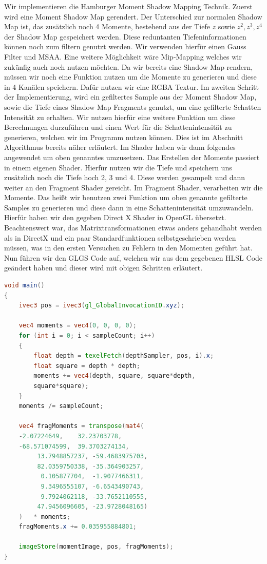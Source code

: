 \documentclass[runningheaders,a4paper]{llncs}
\begin{document}
Wir implementieren die Hamburger Moment Shadow Mapping Technik. 
Zuerst wird eine Moment Shadow Map gerendert. Der Unterschied zur normalen Shadow Map ist, das zusätzlich noch 4 Momente, bestehend aus der Tiefe $z$ sowie $z^2,z^3,z^4$ der Shadow Map gespeichert werden. Diese reduntanten Tiefeninformationen können noch zum filtern genutzt werden. Wir verwenden hierfür einen Gauss Filter und MSAA. Eine weitere Möglichkeit wäre Mip-Mapping welches wir zukünfig auch noch nutzen möchten. Da wir bereits eine Shadow Map rendern, müssen wir  noch eine Funktion nutzen um die Momente zu generieren und diese in 4 Kanälen speichern. Dafür nutzen wir eine RGBA Textur.
Im zweiten Schritt der Implementierung, wird ein gefiltertes Sample aus der Moment Shadow Map, sowie die Tiefe eines Shadow Map Fragments genutzt, um eine gefilterte Schatten Intensität zu erhalten.
Wir nutzen hierfür eine weitere Funktion um diese Berechnungen durzuführen und einen Wert für die Schattenintensität zu generieren, welchen wir im Programm nutzen können. Dies ist im Abschnitt Algorithmus bereits näher erläutert.
Im Shader haben wir dann folgendes angewendet um oben genanntes umzusetzen.
Das Erstellen der Momente passiert in einem eigenen Shader. Hierfür nutzen wir die Tiefe und speichern uns zusätzlich noch die Tiefe hoch 2, 3 und 4. Diese werden gesampelt und dann weiter an den Fragment Shader gereicht.
Im Fragment Shader, verarbeiten wir die Momente. Das heißt wir benutzen zwei Funktion um oben genannte gefilterte Samples zu generieren und diese dann in eine Schattenintensität umzuwandeln. Hierfür haben wir den gegeben Direct X Shader in OpenGL übersetzt. Beachtenswert war, das Matrixtransformationen etwas anders gehandhabt werden als in DirectX und ein paar Standardfunktionen selbstgeschrieben werden müssen, was in den ersten Versuchen zu Fehlern in den Momenten geführt hat. Nun führen wir den GLGS Code auf, welchen wir aus dem gegebenen HLSL Code geändert haben und dieser wird mit obigen Schritten erläutert.

\begin{lstlisting}[language=GLSL]
void main()
{
    ivec3 pos = ivec3(gl_GlobalInvocationID.xyz);

    vec4 moments = vec4(0, 0, 0, 0);
    for (int i = 0; i < sampleCount; i++)
    {
        float depth = texelFetch(depthSampler, pos, i).x;
        float square = depth * depth;
        moments += vec4(depth, square, square*depth, 
        square*square);
    }
    moments /= sampleCount;

	vec4 fragMoments = transpose(mat4(
	-2.07224649,	32.23703778,
	-68.571074599,	39.3703274134,
    	 13.7948857237,	-59.4683975703,
    	 82.0359750338,	-35.364903257,
    	  0.105877704,	-1.9077466311,
    	  9.3496555107,	-6.6543490743,
    	  9.7924062118,	-33.7652110555,
    	 47.9456096605,	-23.9728048165)
    )	* moments;
	fragMoments.x += 0.035955884801;

    imageStore(momentImage, pos, fragMoments);
}
\end{lstlisting}
\end{document}
